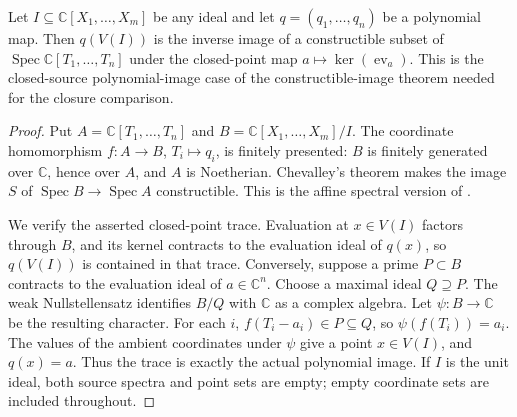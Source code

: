 \begin{lemma}
\label{lem:balanced-constructible-image}
\leanok
Let $I\subseteq\mathbb C[X_1,\ldots,X_m]$ be any ideal and let
$q=(q_1,\ldots,q_n)$ be a polynomial map. Then $q(V(I))$ is the inverse
image of a constructible subset of $\operatorname{Spec}\mathbb C[T_1,\ldots,T_n]$
under the closed-point map $a\mapsto\ker(\operatorname{ev}_a)$.
This is the closed-source polynomial-image case of the constructible-image
theorem needed for the closure comparison.
\end{lemma}
\begin{proof}
Put $A=\mathbb C[T_1,\ldots,T_n]$ and
$B=\mathbb C[X_1,\ldots,X_m]/I$. The coordinate homomorphism
$f:A\to B$, $T_i\mapsto q_i$, is finitely presented: $B$ is finitely
generated over $\mathbb C$, hence over $A$, and $A$ is Noetherian.
Chevalley's theorem makes the image $S$ of $\operatorname{Spec}B\to
\operatorname{Spec}A$ constructible. This is the affine spectral version
of \cite[Theorem 9.7]{milne-algebraic-geometry}.

We verify the asserted closed-point trace. Evaluation at $x\in V(I)$
factors through $B$, and its kernel contracts to the evaluation ideal of
$q(x)$, so $q(V(I))$ is contained in that trace. Conversely, suppose a
prime $P\subset B$ contracts to the evaluation ideal of $a\in\mathbb C^n$.
Choose a maximal ideal $Q\supseteq P$. The weak Nullstellensatz identifies
$B/Q$ with $\mathbb C$ as a complex algebra. Let $\psi:B\to\mathbb C$
be the resulting character. For each $i$, $f(T_i-a_i)\in P\subseteq Q$,
so $\psi(f(T_i))=a_i$. The values of the ambient coordinates under $\psi$
give a point $x\in V(I)$, and $q(x)=a$. Thus the trace is exactly the
actual polynomial image. If $I$ is the unit ideal, both source spectra
and point sets are empty; empty coordinate sets are included throughout.
\end{proof}


